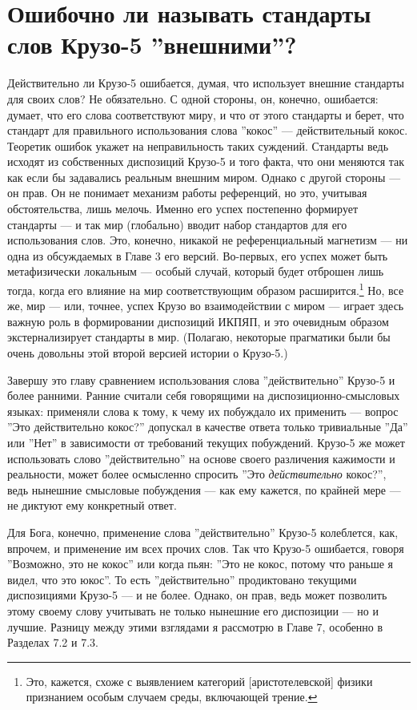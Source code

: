 \documentclass[11pt]{book}
\begin{document}
\section{Ошибочно ли называть стандарты слов Крузо-5 ''внешними''?}

Действительно ли Крузо-5 ошибается, думая, что использует внешние стандарты для своих слов? Не обязательно. С одной стороны, он, конечно, ошибается: думает, что его слова соответствуют миру, и что от этого стандарты и берет, что стандарт для правильного использования слова ''кокос'' --- действительный кокос. Теоретик ошибок укажет на неправильность таких суждений. Стандарты ведь исходят из собственных диспозиций Крузо-5 и того факта, что они меняются так как если бы задавались реальным внешним миром. Однако с другой стороны --- он прав. Он не понимает механизм работы референций, но это, учитывая обстоятельства, лишь мелочь. Именно его успех постепенно формирует стандарты --- и так мир (глобально) вводит набор стандартов для его использования слов. Это, конечно, никакой не референциальный магнетизм --- ни одна из обсуждаемых в Главе 3 его версий. Во-первых, его успех может быть метафизически локальным --- особый случай, который будет отброшен лишь тогда, когда его влияние на мир соответствующим образом расширится.\footnote{Это, кажется, схоже с выявлением категорий [аристотелевской] физики признанием особым случаем среды, включающей трение.} Но, все же, мир --- или, точнее, успех Крузо во взаимодействии с миром --- играет здесь важную роль в формировании диспозиций ИКПЯП, и это очевидным образом экстернализирует стандарты в мир. (Полагаю, некоторые прагматики были бы очень довольны этой второй версией истории о Крузо-5.)

Завершу это главу сравнением использования слова ''действительно'' Крузо-5 и более ранними. Ранние считали себя говорящими на диспозиционно-смысловых языках: применяли слова к тому, к чему их побуждало их применить --- вопрос ''Это действительно кокос?'' допускал в качестве ответа только тривиальные ''Да'' или ''Нет'' в зависимости от требований текущих побуждений. Крузо-5 же может использовать слово ''действительно'' на основе своего различения кажимости и реальности, может более осмысленно спросить ''Это \textit{действительно} кокос?'', ведь нынешние смысловые побуждения --- как ему кажется, по крайней мере --- не диктуют ему конкретный ответ.

Для Бога, конечно, применение слова ''действительно'' Крузо-5 колеблется, как, впрочем, и применение им всех прочих слов. Так что Крузо-5 ошибается, говоря ''Возможно, это не кокос'' или когда пьян: ''Это не кокос, потому что раньше я видел, что это юкос''. То есть ''действительно'' продиктовано текущими диспозициями Крузо-5 --- и не более. Однако, он прав, ведь может позволить этому своему слову учитывать не только нынешние его диспозиции --- но и лучшие. Разницу между этими взглядами я рассмотрю в Главе 7, особенно в Разделах 7.2 и 7.3.
\end{document}
